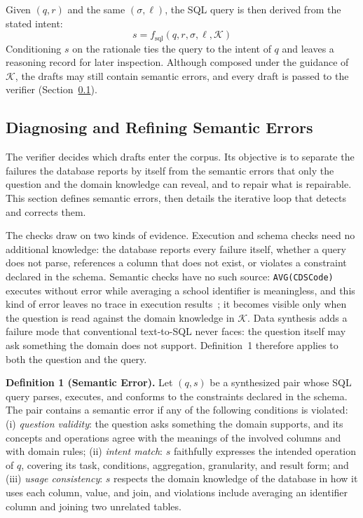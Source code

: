 \documentclass[letterpaper,journal]{IEEEtran}
\begin{document}
Given $(q, r)$ and the same $(\sigma, \ell)$, the SQL query is then derived from the stated intent:
\begin{equation}
s = f_{\text{sql}}(q, r, \sigma, \ell, \mathcal{K})
\end{equation}
Conditioning $s$ on the rationale ties the query to the intent of $q$ and leaves a reasoning record for later inspection. Although composed under the guidance of $\mathcal{K}$, the drafts may still contain semantic errors, and every draft is passed to the verifier (Section~\ref{subsec:refinement}).

\subsection{Diagnosing and Refining Semantic Errors}
\label{subsec:refinement}

The verifier decides which drafts enter the corpus. Its objective is to separate the failures the database reports by itself from the semantic errors that only the question and the domain knowledge can reveal, and to repair what is repairable. This section defines semantic errors, then details the iterative loop that detects and corrects them.

The checks draw on two kinds of evidence. Execution and schema checks need no additional knowledge: the database reports every failure itself, whether a query does not parse, references a column that does not exist, or violates a constraint declared in the schema. Semantic checks have no such source: \texttt{AVG(CDSCode)} executes without error while averaging a school identifier is meaningless, and this kind of error leaves no trace in execution results~\cite{shen2025study}; it becomes visible only when the question is read against the domain knowledge in $\mathcal{K}$. Data synthesis adds a failure mode that conventional text-to-SQL never faces: the question itself may ask something the domain does not support. Definition~1 therefore applies to both the question and the query.

\textbf{Definition 1 (Semantic Error).} Let $(q,s)$ be a synthesized pair whose SQL query parses, executes, and conforms to the constraints declared in the schema. The pair contains a semantic error if any of the following conditions is violated: (i) \emph{question validity}: the question asks something the domain supports, and its concepts and operations agree with the meanings of the involved columns and with domain rules; (ii) \emph{intent match}: $s$ faithfully expresses the intended operation of $q$, covering its task, conditions, aggregation, granularity, and result form; and (iii) \emph{usage consistency}: $s$ respects the domain knowledge of the database in how it uses each column, value, and join, and violations include averaging an identifier column and joining two unrelated tables.
\end{document}
